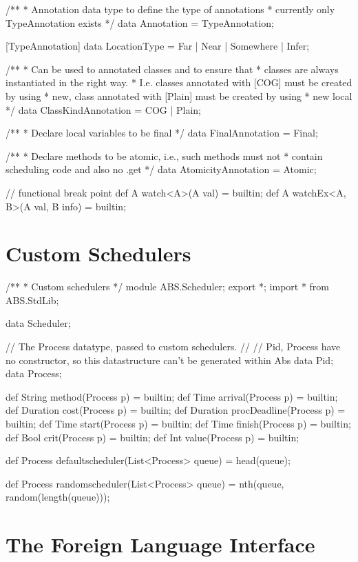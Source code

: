 \begin{abscode}
/**
 * Annotation data type to define the type of annotations
 * currently only TypeAnnotation exists
 */
data Annotation = TypeAnnotation; 
 
[TypeAnnotation]
data LocationType = Far | Near | Somewhere | Infer;
 
/**
 * Can be used to annotated classes and to ensure that
 * classes are always instantiated in the right way.
 * I.e. classes annotated with [COG] must be created by using
 * new, class annotated with [Plain] must be created by using
 * new local
 */
data ClassKindAnnotation = COG | Plain;

/**
 * Declare local variables to be final
 */
data FinalAnnotation = Final;

/**
 * Declare methods to be atomic, i.e., such methods must not
 * contain scheduling code and also no .get
 */ 
data AtomicityAnnotation = Atomic;

// functional break point
def A watch<A>(A val) = builtin;
def A watchEx<A, B>(A val, B info) = builtin;
\end{abscode}

\section{Custom Schedulers}

\begin{abscode}
/**
 * Custom schedulers
 */
module ABS.Scheduler;
export *;
import * from ABS.StdLib;

data Scheduler;

// The Process datatype, passed to custom schedulers.
// 
// Pid, Process have no constructor, so this datastructure can't be generated within Abs
data Pid;
data Process;

def String method(Process p) = builtin;
def Time arrival(Process p) = builtin;
def Duration cost(Process p) = builtin;
def Duration procDeadline(Process p) = builtin;
def Time start(Process p) = builtin;
def Time finish(Process p) = builtin;
def Bool crit(Process p) = builtin;
def Int value(Process p) = builtin;

def Process defaultscheduler(List<Process> queue) = head(queue);

def Process randomscheduler(List<Process> queue) = nth(queue, random(length(queue)));
\end{abscode}

\section{The Foreign Language Interface}

